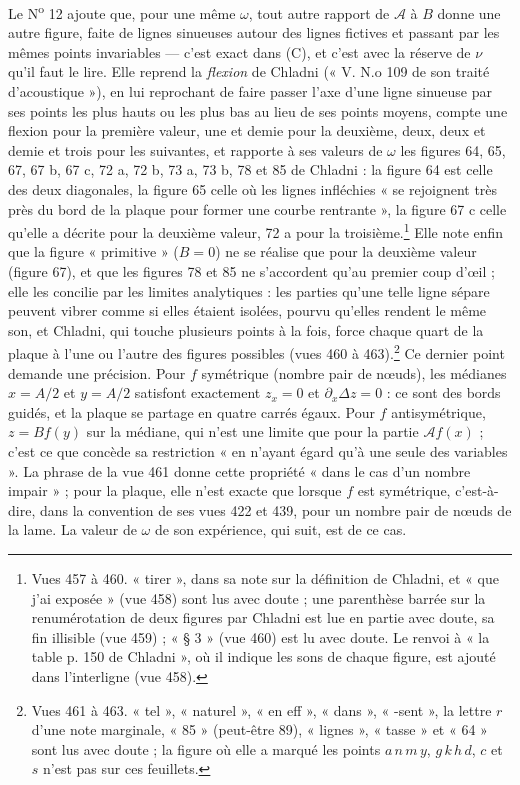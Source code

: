 \documentclass[11pt,a4paper]{article}
\begin{document}
Le N\textsuperscript{o} 12 ajoute que, pour une même $\omega$, tout autre rapport de
$\mathcal{A}$ à $B$ donne une autre figure, faite de lignes sinueuses autour des lignes
fictives et passant par les mêmes points invariables — c'est exact dans (C), et c'est
avec la réserve de $\nu$ qu'il faut le lire. Elle reprend la \emph{flexion} de Chladni
(« V. N.o 109 de son traité d'acoustique »), en lui reprochant de faire passer l'axe
d'une ligne sinueuse par ses points les plus hauts ou les plus bas au lieu de ses
points moyens, compte une flexion pour la première valeur, une et demie pour la
deuxième, deux, deux et demie et trois pour les suivantes, et rapporte à ses valeurs
de $\omega$ les figures 64, 65, 67, 67 b, 67 c, 72 a, 72 b, 73 a, 73 b, 78 et 85 de
Chladni : la figure 64 est celle des deux diagonales, la figure 65 celle où les lignes
infléchies « se rejoignent très près du bord de la plaque pour former une courbe
rentrante », la figure 67 c celle qu'elle a décrite pour la deuxième valeur, 72 a pour
la troisième.\footnote{Vues 457 à 460. « tirer », dans sa note sur la définition de
Chladni, et « que j'ai exposée » (vue 458) sont lus avec doute ; une parenthèse barrée
sur la renumérotation de deux figures par Chladni est lue en partie avec doute, sa fin
illisible (vue 459) ; « § 3 » (vue 460) est lu avec doute. Le renvoi à « la table
p. 150 de Chladni », où il indique les sons de chaque figure, est ajouté dans
l'interligne (vue 458).} Elle note enfin que la figure « primitive » ($B = 0$) ne se
réalise que pour la deuxième valeur (figure 67), et que les figures 78 et 85 ne
s'accordent qu'au premier coup d'œil ; elle les concilie par les limites analytiques :
les parties qu'une telle ligne sépare peuvent vibrer comme si elles étaient isolées,
pourvu qu'elles rendent le même son, et Chladni, qui touche plusieurs points à la fois,
force chaque quart de la plaque à l'une ou l'autre des figures possibles (vues 460 à
463).\footnote{Vues 461 à 463. « tel », « naturel », « en eff », « dans », « -sent »,
la lettre $r$ d'une note marginale, « 85 » (peut-être 89), « lignes », « tasse » et
« 64 » sont lus avec doute ; la figure où elle a marqué les points $a\,n\,m\,y$,
$g\,k\,h\,d$, $c$ et $s$ n'est pas sur ces feuillets.} Ce dernier point demande une
précision. Pour $f$ symétrique (nombre pair de nœuds), les médianes $x = A/2$ et
$y = A/2$ satisfont exactement $z_x = 0$ et $\partial_x\Delta z = 0$ : ce sont des
bords guidés, et la plaque se partage en quatre carrés égaux. Pour $f$ antisymétrique,
$z = B f(y)$ sur la médiane, qui n'est une limite que pour la partie
$\mathcal{A}f(x)$ ; c'est ce que concède sa restriction « en n'ayant égard qu'à une
seule des variables ». La phrase de la vue 461 donne cette propriété « dans le cas d'un
nombre impair » ; pour la plaque, elle n'est exacte que lorsque $f$ est symétrique,
c'est-à-dire, dans la convention de ses vues 422 et 439, pour un nombre pair de nœuds
de la lame. La valeur de $\omega$ de son expérience, qui suit, est de ce cas.
\end{document}
